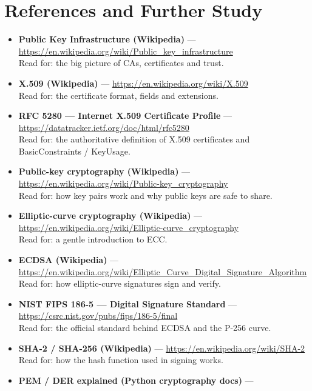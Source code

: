 \documentclass[11pt,a4paper]{article}
\begin{document}
\section{References and Further Study}
\begin{itemize}
  \item \textbf{Public Key Infrastructure (Wikipedia)} ---
        \url{https://en.wikipedia.org/wiki/Public_key_infrastructure}\\
        Read for: the big picture of CAs, certificates and trust.
  \item \textbf{X.509 (Wikipedia)} ---
        \url{https://en.wikipedia.org/wiki/X.509}\\
        Read for: the certificate format, fields and extensions.
  \item \textbf{RFC 5280 --- Internet X.509 Certificate Profile} ---
        \url{https://datatracker.ietf.org/doc/html/rfc5280}\\
        Read for: the authoritative definition of X.509 certificates and
        BasicConstraints / KeyUsage.
  \item \textbf{Public-key cryptography (Wikipedia)} ---
        \url{https://en.wikipedia.org/wiki/Public-key_cryptography}\\
        Read for: how key pairs work and why public keys are safe to share.
  \item \textbf{Elliptic-curve cryptography (Wikipedia)} ---
        \url{https://en.wikipedia.org/wiki/Elliptic-curve_cryptography}\\
        Read for: a gentle introduction to ECC.
  \item \textbf{ECDSA (Wikipedia)} ---
        \url{https://en.wikipedia.org/wiki/Elliptic_Curve_Digital_Signature_Algorithm}\\
        Read for: how elliptic-curve signatures sign and verify.
  \item \textbf{NIST FIPS 186-5 --- Digital Signature Standard} ---
        \url{https://csrc.nist.gov/pubs/fips/186-5/final}\\
        Read for: the official standard behind ECDSA and the P-256 curve.
  \item \textbf{SHA-2 / SHA-256 (Wikipedia)} ---
        \url{https://en.wikipedia.org/wiki/SHA-2}\\
        Read for: how the hash function used in signing works.
  \item \textbf{PEM / DER explained (Python cryptography docs)} ---

\end{itemize}
\end{document}
